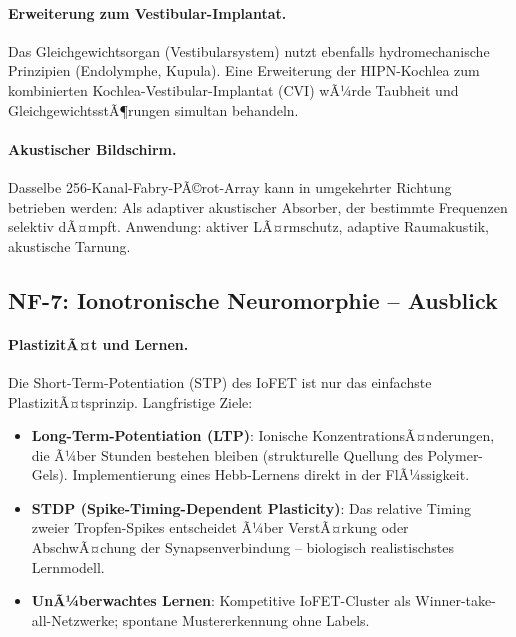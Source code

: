 ﻿\documentclass[a4paper,12pt]{scrreprt}
\theoremstyle{definition}
\begin{document}
\paragraph{Erweiterung zum Vestibular-Implantat.}
Das Gleichgewichtsorgan (Vestibularsystem) nutzt ebenfalls
hydromechanische Prinzipien (Endolymphe, Kupula). Eine
Erweiterung der HIPN-Kochlea zum kombinierten
Kochlea-Vestibular-Implantat (CVI) wÃ¼rde Taubheit und
GleichgewichtsstÃ¶rungen simultan behandeln.

\paragraph{Akustischer Bildschirm.}
Dasselbe 256-Kanal-Fabry-PÃ©rot-Array kann in umgekehrter Richtung
betrieben werden: Als adaptiver akustischer Absorber, der bestimmte
Frequenzen selektiv dÃ¤mpft. Anwendung: aktiver LÃ¤rmschutz,
adaptive Raumakustik, akustische Tarnung.

\subsection*{NF-7: Ionotronische Neuromorphie -- Ausblick}

\paragraph{PlastizitÃ¤t und Lernen.}
Die Short-Term-Potentiation (STP) des IoFET ist nur das einfachste
PlastizitÃ¤tsprinzip. Langfristige Ziele:
\begin{itemize}
  \item \textbf{Long-Term-Potentiation (LTP)}: Ionische
    KonzentrationsÃ¤nderungen, die Ã¼ber Stunden bestehen bleiben
    (strukturelle Quellung des Polymer-Gels). Implementierung
    eines Hebb-Lernens direkt in der FlÃ¼ssigkeit.
  \item \textbf{STDP (Spike-Timing-Dependent Plasticity)}: Das
    relative Timing zweier Tropfen-Spikes entscheidet Ã¼ber
    VerstÃ¤rkung oder AbschwÃ¤chung der Synapsenverbindung --
    biologisch realistischstes Lernmodell.
  \item \textbf{UnÃ¼berwachtes Lernen}: Kompetitive IoFET-Cluster
    als Winner-take-all-Netzwerke; spontane Mustererkennung ohne
    Labels.
\end{itemize}
\end{document}
